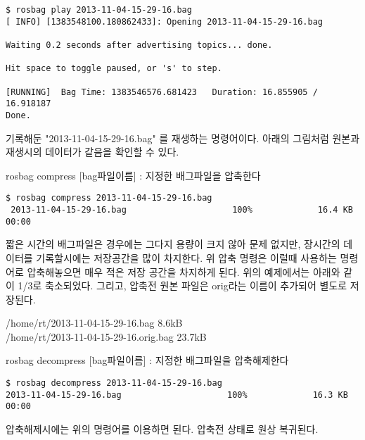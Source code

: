 \begin{lstlisting}[language=ROS]
$ rosbag play 2013-11-04-15-29-16.bag 
[ INFO] [1383548100.180862433]: Opening 2013-11-04-15-29-16.bag

Waiting 0.2 seconds after advertising topics... done.

Hit space to toggle paused, or 's' to step.

[RUNNING]  Bag Time: 1383546576.681423   Duration: 16.855905 / 16.918187     
Done.
\end{lstlisting}

\noindent
기록해둔 "2013-11-04-15-29-16.bag" 를 재생하는 명령어이다. 아래의 그림처럼 원본과 재생시의 데이터가 같음을 확인할 수 있다.

\vspace{\baselineskip}
\noindent
{}\circled{\thenum} rosbag compress [bag파일이름] : 지정한 배그파일을 압축한다

\begin{lstlisting}[language=ROS]
$ rosbag compress 2013-11-04-15-29-16.bag 
 2013-11-04-15-29-16.bag                     100%             16.4 KB 00:00  
\end{lstlisting}

\noindent
짧은 시간의 배그파일은 경우에는 그다지 용량이 크지 않아 문제 없지만, 장시간의 데이터를 기록할시에는 저장공간을 많이 차지한다. 위 압축 명령은 이럴때 사용하는 명령어로 압축해놓으면 매우 적은 저장 공간을 차지하게 된다. 위의 예제에서는 아래와 같이 1/3로 축소되었다. 그리고, 압축전 원본 파일은 orig라는 이름이 추가되어 별도로 저장된다.

\vspace{\baselineskip}
\noindent
/home/rt/2013-11-04-15-29-16.bag 8.6kB\\
/home/rt/2013-11-04-15-29-16.orig.bag 23.7kB

\vspace{\baselineskip}
\noindent
{}\circled{\thenum} rosbag decompress [bag파일이름] : 지정한 배그파일을 압축해제한다

\begin{lstlisting}[language=ROS]
$ rosbag decompress 2013-11-04-15-29-16.bag 
2013-11-04-15-29-16.bag                     100%             16.3 KB 00:00  
\end{lstlisting}

\noindent
압축해제시에는 위의 명령어를 이용하면 된다. 압축전 상태로 원상 복귀된다.



